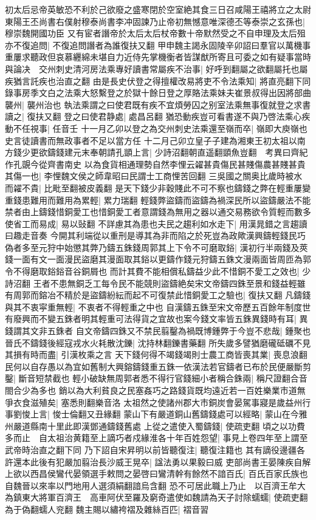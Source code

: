 初太后忌帝英敏恐不利於己欲廢之盛寒閉於空室絶其食三日召咸陽王禧將立之太尉東陽王丕尚書右僕射穆泰尚書李冲固諫乃止帝初無憾意唯深德丕等泰崇之玄孫也|{
	穆崇魏開國功臣}
又有宦者譖帝於太后太后杖帝數十帝默然受之不自申理及太后殂亦不復追問|{
	不復追問譖者為誰復扶又翻}
甲申魏主謁永固陵辛卯詔曰羣官以萬機事重屢求聽政但哀慕纒綿未堪自力近侍先掌機衡者皆謀猷所寄且可委之如有疑事當時與論决　交州刺史清河房法乘專好讀書常屬疾不治事|{
	好呼到翻屬之欲翻屬托也屬疾猶言託疾也治直之翻}
由是長史伏登之得擅權改易將吏不令法乘知|{
	將直亮翻下同}
錄事房季文白之法乘大怒繫登之於獄十餘日登之厚賂法乘妹夫崔景叔得出因將部曲襲州|{
	襲州治也}
執法乘謂之曰使君既有疾不宜煩勞囚之别室法乘無事復就登之求書讀之|{
	復扶又翻}
登之曰使君静處|{
	處昌呂翻}
猶恐動疾豈可看書遂不與乃啓法乘心疾動不任視事|{
	任音壬}
十一月乙卯以登之為交州刺史法乘還至嶺而卒|{
	嶺即大庾嶺也史言徒讀書而無政事者不足以當方任}
十二月己卯立皇子子建為湘東王初太祖以南方錢少更欲鑄錢建元末奉朝請孔顗上言|{
	少詩沼翻朝直遥翻顗魚豈翻　考異曰齊紀作孔覬今從齊書南史}
以為食貨相通理勢自然李悝云糴甚貴傷民甚賤傷農甚賤甚貴其傷一也|{
	李悝魏文侯之師韋昭曰民謂士工商悝苦回翻}
三吳國之關奥比歲時被水而糴不貴|{
	比毗至翻被皮義翻}
是天下錢少非穀賤此不可不察也鑄錢之弊在輕重屢變重錢患難用而難用為累輕|{
	累力瑞翻}
輕錢弊盜鑄而盜鑄為禍深民所以盜鑄嚴法不能禁者由上鑄錢惜銅愛工也惜銅愛工者意謂錢為無用之器以通交易務欲令質輕而數多使省工而易成|{
	易以䜴翻}
不詳慮其為患也夫民之趨利如水走下|{
	用漢晁錯之言趨讀曰趣走音奏}
今開其利端從以重刑是導其為非而陷之於死豈為政歟漢興鑄輕錢民巧偽者多至元狩中始懲其弊乃鑄五銖錢周郭其上下令不可磨取鋊|{
	漢初行半兩錢及莢錢一面有文一面漫民盜磨其漫面取其鋊以更鑄作錢元狩鑄五銖文漫兩面皆周匝為郭令不得磨取鋊鋊音谷銅屑也}
而計其費不能相償私鑄益少此不惜銅不愛工之效也|{
	少詩沼翻}
王者不患無銅乏工每令民不能競則盜鑄絶矣宋文帝鑄四銖至景和錢益輕雖有周郭而鎔冶不精於是盜鑄紛紜而起不可復禁此惜銅愛工之驗也|{
	復扶又翻}
凡鑄錢與其不衷寜重無輕|{
	不衷者不得輕重之中也}
自漢鑄五銖至宋文帝歷五百餘年制度世有廢興而不變五銖者明其輕重可法得貨之宜故也案今錢文率皆五銖異錢時有耳|{
	異錢謂其文非五銖者}
自文帝鑄四銖又不禁民翦鑿為禍既博鍾弊于今豈不悲哉|{
	鍾聚也}
晉氏不鑄錢後經寇戎水火耗散沈鑠|{
	沈持林翻鑠書藥翻}
所失歲多譬猶磨礲砥礪不見其損有時而盡|{
	引漢枚乘之言}
天下錢何得不竭錢竭則士農工商皆喪其業|{
	喪息浪翻}
民何以自存愚以為宜如舊制大興鎔鑄錢重五銖一依漢法若官鑄者已布於民便嚴斷剪鑿|{
	斷音短禁截也}
輕小破缺無周郭者悉不得行官錢細小者稱合銖兩|{
	稱尺證翻合音閤合少為多也}
銷以為大利貧良之民塞姦巧之路錢貨既均遠近若一百姓樂業市道無爭衣食滋殖矣|{
	塞悉則翻樂音洛}
太祖然之使諸州郡大市銅炭會晏駕事寢是歲益州行事劉悛上言|{
	悛士倫翻又丑緣翻}
蒙山下有嚴道銅山舊鑄錢處可以經略|{
	蒙山在今雅州嚴道縣南十里此即漢鄧通鑄錢舊處}
上從之遣使入蜀鑄錢|{
	使疏吏翻}
頃之以功費多而止　自太祖治黄籍至上謫巧者戍緣淮各十年百姓怨望|{
	事見上卷四年至上謂至武帝時治直之翻下同}
乃下詔自宋昇明以前皆聽復注|{
	聽復注籍也}
其有謫役邊疆各許還本此後有犯嚴加翦治長沙威王晃卒|{
	諡法勇以果毅曰威}
吏部尚書王晏陳疾自解上欲以西昌侯鸞代晏領選手敕問之晏啓曰鸞清幹有餘然不諳百氏|{
	百氏百家氏族也自魏晉以來率以門地用人選須絹翻諳烏含翻}
恐不可居此職上乃止　以百濟王牟大為鎮東大將軍百濟王　高車阿伏至羅及窮奇遣使如魏請為天子討除蠕蠕|{
	使疏吏翻為于偽翻蠕人兖翻}
魏主賜以繡袴褶及雜絲百匹|{
	褶音習}


